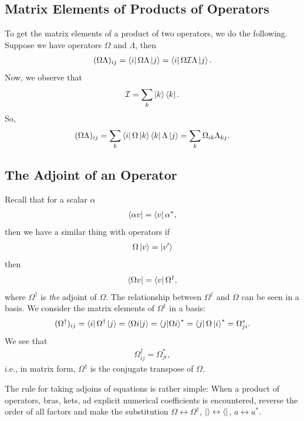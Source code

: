\documentclass{book}
\theoremstyle{definition}
\begin{document}
\subsection{Matrix Elements of Products of Operators}

To get the matrix elements of a product of two operators, we do the following. Suppose we have operators $\Omega$ and $\Lambda$, then
\begin{align}
(\Omega\Lambda)_{ij} = \bra{i}\Omega\Lambda\ket{j} = \bra{i}\Omega \mathcal{I} \Lambda \ket{j}.
\end{align}
Now, we observe that 
\begin{align}
\mathcal{I} = \sum_k \ket{k}\bra{k}. 
\end{align}
So, 
\begin{align}
(\Omega \Lambda)_{ij} = \sum_k \bra{i}\Omega\ket{k}\bra{k}\Lambda \ket{j} = \sum_k \Omega_{ik}\Lambda_{kj}.
\end{align}



\subsection{The Adjoint of an Operator}
Recall that for a scalar $\alpha$
\begin{align}
\bra{\alpha v} = \bra{v}\alpha^*,
\end{align}
then we have a similar thing with operators if
\begin{align}
\Omega\ket{v} = \ket{v'}
\end{align}
then 
\begin{align}
\bra{\Omega v} = \bra{v}\Omega^\dagger,
\end{align}
where $\Omega^\dagger$ is \textit{the} adjoint of $\Omega$. The relationship between $\Omega^\dagger$ and $\Omega$ can be seen in a basis. We consider the matrix elements of $\Omega^\dagger$ in a basis:
\begin{align}
(\Omega^\dagger)_{ij} = \bra{i}\Omega^\dagger \ket{j} = \bra{\Omega i}\ket{j} = \bra{j}\ket{\Omega i}^* = \bra{j} \Omega \ket{i}^* = \Omega_{ji}^*.
\end{align}
We see that
\begin{align}
\Omega^\dagger_{ij} = \Omega^*_{ji},
\end{align}
i.e., in matrix form, $\Omega^\dagger$ is the conjugate transpose of $\Omega$. 

The rule for taking adjoins of equations is rather simple: When a product of operators, bras, kets, ad explicit numerical coefficients is encountered, reverse the order of all factors and make the substitution $\Omega \leftrightarrow \Omega^\dagger$, $\ket{} \leftrightarrow \bra{}$, $a \leftrightarrow a^*$. 
\end{document}
